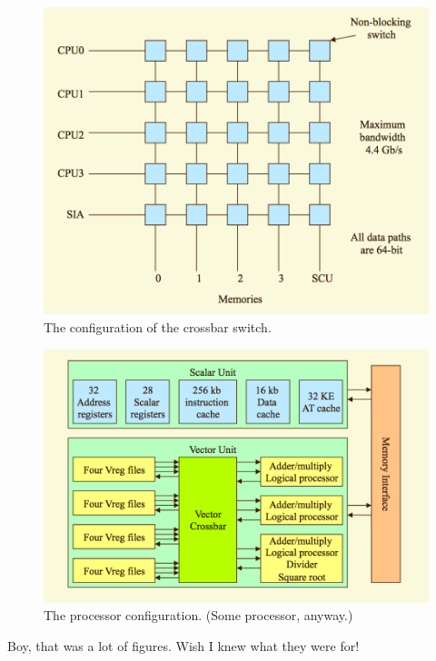 \begin{figure}
\centering
\includegraphics[width=0.5\linewidth]{figures/screenshot094}
\caption{The configuration of the crossbar switch.}
\label{fig:screenshot094}
\end{figure}

\begin{figure}
\centering
\includegraphics[width=0.5\linewidth]{figures/screenshot095}
\caption[The processor configuration.]{The processor configuration. (Some processor, anyway.)}
\label{fig:screenshot095}
\end{figure}

\pagebreak

Boy, that was a lot of figures. Wish I knew what they were for!
